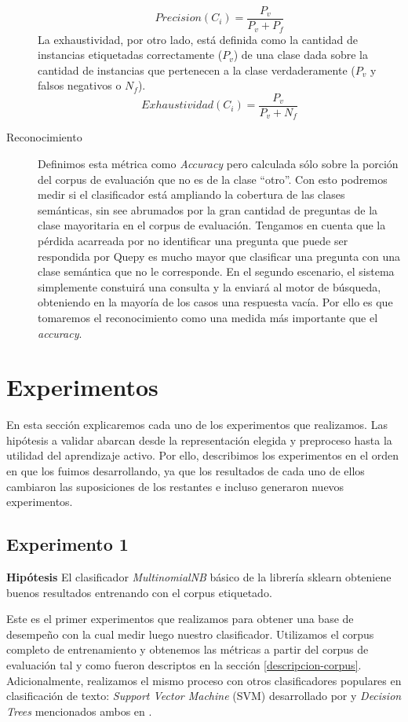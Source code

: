 \begin{description}
    $$Precision(C_i) = \frac{P_v}{P_v + P_f}$$
    La exhaustividad, por otro lado, está definida como la cantidad de instancias etiquetadas correctamente ($P_v$) de una clase dada sobre la cantidad de instancias que pertenecen a la clase verdaderamente ($P_v$ y falsos negativos o $N_f$).
    $$Exhaustividad(C_i) = \frac{P_v}{P_v + N_f}$$
    \item[Reconocimiento] Definimos esta métrica como \textit{Accuracy} pero calculada sólo sobre la porción del corpus de evaluación que no es de la clase ``otro''. Con esto podremos medir si el clasificador está ampliando la cobertura de las clases semánticas, sin see abrumados por la gran cantidad de preguntas de la clase mayoritaria en el corpus de evaluación. Tengamos en cuenta que la pérdida acarreada por no identificar una pregunta que puede ser respondida por Quepy es mucho mayor que clasificar una pregunta con una clase semántica que no le corresponde. En el segundo escenario, el sistema simplemente constuirá una consulta y la enviará al motor de búsqueda, obteniendo en la mayoría de los casos una respuesta vacía. Por ello es que tomaremos el reconocimiento como una medida más importante que el \textit{accuracy}.
\end{description}

\section{Experimentos}

En esta sección explicaremos cada uno de los experimentos que realizamos. Las hipótesis a validar abarcan desde la representación elegida y preproceso hasta la utilidad del aprendizaje activo. Por ello, describimos los experimentos en el orden en que los fuimos desarrollando, ya que los resultados de cada uno de ellos cambiaron las suposiciones de los restantes e incluso generaron nuevos experimentos.

\subsection{Experimento 1}
\vspace{3 mm}
\textbf{Hipótesis} El clasificador \textit{MultinomialNB} básico de la librería sklearn obteniene buenos resultados entrenando con el corpus etiquetado.
\vspace{3 mm}

Este es el primer experimentos que realizamos para obtener una base de desempeño con la cual medir luego nuestro clasificador. Utilizamos el corpus completo de entrenamiento y obtenemos las métricas a partir del corpus de evaluación tal y como fueron descriptos en la sección \ref{descripcion-corpus}.
Adicionalmente, realizamos el mismo proceso con otros clasificadores populares en clasificación de texto: \textit{Support Vector Machine} (SVM) desarrollado por \citet{svm-cortes} y \textit{Decision Trees} mencionados ambos en \citet{Sebastiani-text-categorization}.

